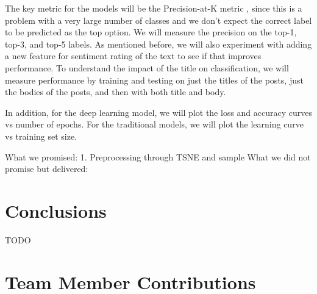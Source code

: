 \documentclass{sig-alternate-05-2015}
\begin{document}
The key metric for the models will be the Precision-at-K metric \cite{krizhevsky2012imagenet}, since this is a problem with a very large number of classes and we don't expect the correct label to be predicted as the top option. We will measure the precision on the top-1, top-3, and top-5 labels. As mentioned before, we will also experiment with adding a new feature for sentiment rating of the text to see if that improves performance. To understand the impact of the title on classification, we will measure performance by training and testing on just the titles of the posts, just the bodies of the posts, and then with both title and body.


In addition, for the deep learning model, we will plot the loss and accuracy curves vs number of epochs. For the traditional models, we will plot the learning curve vs training set size.

What we promised:
1. Preprocessing through TSNE and sample 
What we did not promise but delivered:

\section{Conclusions}
TODO

\section{Team Member Contributions}


%

%
\end{document}
